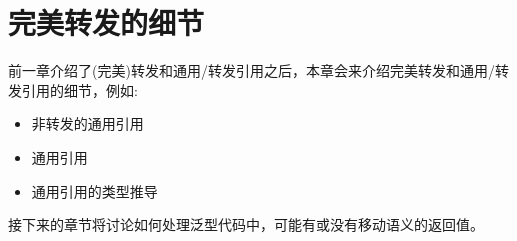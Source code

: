 \chapter{完美转发的细节}
前一章介绍了(完美)转发和通用/转发引用之后，本章会来介绍完美转发和通用/转发引用的细节，例如:

\begin{itemize}
	\item 非转发的通用引用
	\item 通用引用
	\item 通用引用的类型推导
\end{itemize}

接下来的章节将讨论如何处理泛型代码中，可能有或没有移动语义的返回值。





















